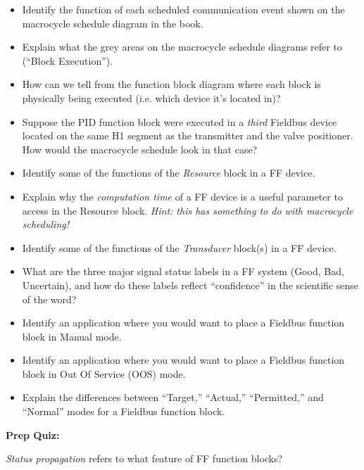 \begin{itemize}
\item{} Identify the function of each scheduled communication event shown on the macrocycle schedule diagram in the book.
\item{} Explain what the grey areas on the macrocycle schedule diagrams refer to (``Block Execution'').
\item{} How can we tell from the function block diagram where each block is physically being executed (i.e. which device it's located in)?
\item{} Suppose the PID function block were executed in a {\it third} Fieldbus device located on the same H1 segment as the transmitter and the valve positioner.  How would the macrocycle schedule look in that case?
\item{} Identify some of the functions of the {\it Resource} block in a FF device.
\item{} Explain why the {\it computation time} of a FF device is a useful parameter to access in the Resource block.  {\it Hint: this has something to do with macrocycle scheduling!}
\item{} Identify some of the functions of the {\it Transducer} block(s) in a FF device.
\item{} What are the three major signal status labels in a FF system (Good, Bad, Uncertain), and how do these labels reflect ``confidence'' in the scientific sense of the word?
\item{} Identify an application where you would want to place a Fieldbus function block in Manual mode.
\item{} Identify an application where you would want to place a Fieldbus function block in Out Of Service (OOS) mode.
\item{} Explain the differences between ``Target,'' ``Actual,'' ``Permitted,'' and ``Normal'' modes for a Fieldbus function block.
\end{itemize}










\vfil \eject

\noindent
{\bf Prep Quiz:}

{\it Status propagation} refers to what feature of FF function blocks?

